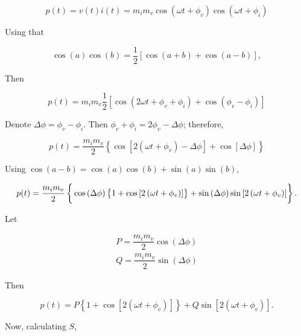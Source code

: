 \begin{equation} p(t) = v(t)i(t) = m_i m_v \cos\left( \omega t + \phi_v \right)\cos\left(\omega t + \phi_i\right) \end{equation}

	Using that

\begin{equation} \cos(a)\cos(b) = \dfrac{1}{2}\left[\cos(a+b) + \cos(a-b)\right], \label{eq:cos_identity}\end{equation}

	Then

\begin{equation} p(t) = m_i m_v \dfrac{1}{2} \left[ \cos\left(2\omega t + \phi_v + \phi_i\right) + \cos\left(\phi_v - \phi_i\right)\right] \end{equation}

	Denote $\Delta\phi = \phi_v - \phi_i$. Then $\phi_v + \phi_i = 2\phi_v - \Delta\phi$; therefore,

\begin{equation} p(t) = \dfrac{m_i m_v}{2} \left\{\cos\left[2\left(\omega t + \phi_v\right) - \Delta\phi\right] + \cos\left[\Delta\phi\right]\right\} \end{equation}

	Using $\cos(a-b) = \cos(a)\cos(b) + \sin(a)\sin(b)$,

\begin{equation} p(t) = \dfrac{m_i m_v}{2} \left\{\raisebox{5mm}{} \cos\left(\Delta\phi\right)\left\{\raisebox{3mm}{} 1 + \cos\left[2\left(\omega t + \phi_v\right)\right]\right\} + \sin\left(\Delta\phi\right)\sin\left[2\left(\omega t + \phi_v\right)\right] \right\} . \label{eq:sfp_complex_apparent_power_eq1} \end{equation}

	Let

\begin{align}
	P = \dfrac{m_i m_v}{2} \cos\left(\Delta\phi\right) \\[3mm]
	Q = \dfrac{m_i m_v}{2} \sin\left(\Delta\phi\right)
\end{align}

	Then

\begin{equation} p(t) = P\left\{1 + \cos\left[2\left(\omega t + \phi_v\right) \right]\right\} + Q\sin\left[2\left(\omega t + \phi_v \right)\right] . \label{eq:sfp_complex_apparent_power_eq2} \end{equation}

	Now, calculating $S$,
	
